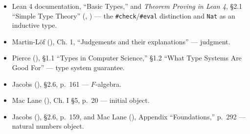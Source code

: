 \begin{itemize}
\tightlist
\item
  Lean 4 documentation, ``Basic Types,'' and \emph{Theorem Proving in Lean 4}, §2.1 ``Simple Type Theory'' (\cite{LeanDocs}, \cite{TPIL4}) --- the \texttt{\#check}/\texttt{\#eval} distinction and \texttt{Nat} as an inductive type.
\item
  Martin-Löf (\cite{MartinLof1984}), Ch. 1, ``Judgements and their explanations'' --- judgment.
\item
  Pierce (\cite{Pierce2002}), §1.1 ``Types in Computer Science,'' §1.2 ``What Type Systems Are Good For'' --- type system guarantee.
\item
  Jacobs (\cite{Jacobs1999}), §2.6, p.~161 --- \(F\)-algebra.
\item
  Mac Lane (\cite{MacLane1998}), Ch. I §5, p.~20 --- initial object.
\item
  Jacobs (\cite{Jacobs1999}), §2.6, p.~159, and Mac Lane (\cite{MacLane1998}), Appendix ``Foundations,'' p.~292 --- natural numbers object.
\end{itemize}
